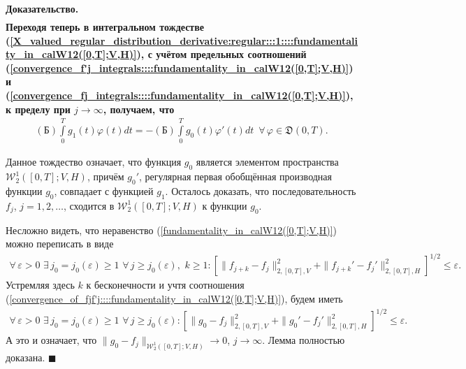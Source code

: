 \documentclass{report}
\newenvironment{Proof}{\par\noindent\bf Доказательство.\rm}{ $\blacksquare$\par}
\begin{document}
\begin{Proof}
\begin{gather}
\end{gather}
Переходя теперь в интегральном тождестве (\ref{X_valued_regular_distribution_derivative:regular:::1::::fundamentality_in_calW12([0,T];V,H)}), с учётом предельных соотношений
(\ref{convergence_f'j_integrals::::fundamentality_in_calW12([0,T];V,H)}) и (\ref{convergence_fj_integrals::::fundamentality_in_calW12([0,T];V,H)}), к пределу при $j\to\infty$, получаем, что
\begin{gather*}
(\textrm{Б})\int\limits_0^T g_1(t)\varphi(t)dt=-(\textrm{Б})\int\limits_0^T g_0(t)\varphi'(t)dt\,\,\,\forall\,\varphi\in\mathfrak{D}(0,T).
\end{gather*}

Данное тождество означает, что функция $g_0$ является элементом пространства $\mathcal{W}^1_2([0,T];V,H)$, причём  $g_0'$, регулярная первая обобщённая производная функции $g_0$, совпадает
с функцией  $g_1$. Осталось доказать, что последовательность $f_j$, $j=1,2,\dots$, сходится в $\mathcal{W}^1_2([0,T];V,H)$ к функции $g_0$.

Несложно видеть, что неравенство (\ref{fundamentality_in_calW12([0,T];V,H)}) можно переписать в виде
\begin{gather*}
\forall\,\varepsilon>0\,\,\exists\,j_0=j_0(\varepsilon)\geqslant1\,\,\forall\,j\geqslant j_0(\varepsilon),\,\,k\geqslant1:
[\|f_{j+k}-f_j\|_{2,[0,T],V}^2+\|f_{j+k}'-f_j'\|_{2,[0,T],H}^2]^{1/2}\leqslant\varepsilon.
\end{gather*}
Устремляя здесь $k$ к бесконечности и учтя соотношения (\ref{convergence_of_fjf'j::::fundamentality_in_calW12([0,T];V,H)}), будем иметь
\begin{gather*}
\forall\,\varepsilon>0\,\,\exists\,j_0=j_0(\varepsilon)\geqslant1\,\,\forall\,j\geqslant j_0(\varepsilon):
[\|g_{0}-f_j\|_{2,[0,T],V}^2+\|g_{0}'-f_j'\|_{2,[0,T],H}^2]^{1/2}\leqslant\varepsilon.
\end{gather*}
А это и означает, что $\|g_{0}-f_j\|_{\mathcal{W}^1_2([0,T];V,H)}\to0$, $j\to\infty$. Лемма полностью доказана.
\end{Proof}
\end{document}
